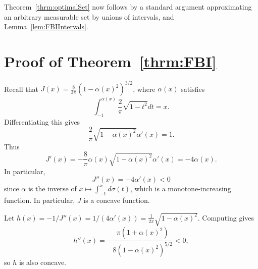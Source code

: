 

Theorem~\ref{thrm:optimalSet} now follows by a standard argument approximating an arbitrary measurable set by unions of intervals, and  Lemma~\ref{lem:FBIIntervals}.

\section{Proof of Theorem~\ref{thrm:FBI}}
Recall that $J(x)=\frac{8}{3\pi} (1-\alpha(x)^2)^{3/2}$, where $\alpha(x)$ satisfies $$
\int_{-1}^{\alpha(x)} \frac{2}{\pi} \sqrt{1-t^2} dt = x.$$ Differentiating this gives $$\frac{2}{\pi} \sqrt{1-\alpha(x)^2} \alpha'(x)=1.$$ 
Thus
$$
J'(x) = -\frac{8}{\pi} \alpha(x)\sqrt{1-\alpha(x)^2} \alpha'(x) = -4\alpha(x).
$$
In particular, $$J''(x) = -4\alpha'(x) <0 $$ since $\alpha$ is the inverse of $x\mapsto \int_{-1}^x d\sigma(t)$, which is a monotone-increasing function. In particular, $J$ is a concave function.  

Let $h (x) = - 1/J''(x) = 1/(4\alpha'(x)) = \frac{1}{2\pi} {\sqrt{1-\alpha(x)^2}}$.  
Computing gives $$h''(x)=-\frac{\pi(1+\alpha(x)^2)}{8(1-\alpha(x)^2)^{5/2}}<0,$$ so $h$ is also concave.

